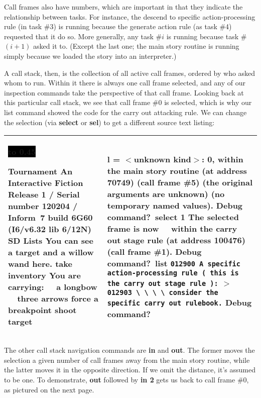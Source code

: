 \documentclass{book}
\newcommand{\n}{\hspace*{\fill}\newline}
\newcommand{\terp}[2]{\begin{center}\begin{tabular}{p{0.45\textwidth}|p{0.45\textwidth}}\midrule #1&#2\\\midrule\end{tabular}\end{center}}
\newcommand{\glkheading}[1]{\textbf{#1}}
\newcommand{\glkinput}[1]{\textbf{#1}}
\newcommand{\glkstatusline}[2]{\centerline{\colorbox{black}{\hbox to 0.45\textwidth{\textcolor{white}{#1\hfil #2}}}}}
\newcommand{\storyprompt}{\raisebox{1.5pt}{\(>\)}}
\newcommand{\cursor}{\raisebox{-1.5pt}{\RectangleThin}}
\newcommand{\markedindent}{\(>\)\qquad}
\newcommand{\unmarkedindent}{\hphantom{\(>\)}\qquad}
\begin{document}
Call frames also have numbers, which are important in that they indicate the
relationship between tasks.  For instance, the descend to specific
action-processing rule (in task \#3) is running because the generate action rule
(as task \#4) requested that it do so.  More generally, any task \#\(i\) is
running because task \#\((i+1)\) asked it to.  (Except the last one; the main
story routine is running simply because we loaded the story into an
interpreter.)

A call stack, then, is the collection of all active call frames, ordered by who
asked whom to run.  Within it there is always one call frame selected, and any
of our inspection commands take the perspective of that call frame.  Looking
back at this particular call stack, we see that call frame \#0 is selected,
which is why our list command showed the code for the carry out attacking rule.
We can change the selection (via \glkinput{select} or \glkinput{sel}) to get a
different source text listing:

\terp{\glkstatusline{Lists}{0/2}\n
  \glkheading{Tournament}\n
  An Interactive Fiction\n
  Release 1 / Serial number 120204 / Inform~7 build 6G60 (I6/v6.32 lib 6/12N) SD\n
  \n
  \glkheading{Lists}\n
  You can see a target and a willow wand here.\n
  \n
  \storyprompt\glkinput{take inventory}\n
  You are carrying:\n
  \null\ \ a longbow\n
  \null\ \ three arrows\n
  \n
  \storyprompt\glkinput{force a breakpoint}\n
  \storyprompt\glkinput{shoot target}}{%
  \qquad \qquad l = \(<\)unknown kind\(>\): 0,\n
  within the main story routine (at address 70749) (call frame \#5)\n
  \null\qquad (the original arguments are unknown)\n
  \null\qquad (no temporary named values).\n
  \n
  Debug command?\ \glkinput{select 1}\n
  \n
  The selected frame is now\n
  \null\ \ within the carry out stage rule (at address 100476) (call frame \#1).\n
  \n
  Debug command?\ \glkinput{list}\n
  \n
  \unmarkedindent \lstinline{012900 A specific action-processing rule ( this is the carry out stage rule ):}\n
  \markedindent \lstinline{012903 \ \ \ \ consider the specific carry out rulebook.}\n
  \n
  Debug command?\ \cursor}

The other call stack navigation commands are \glkinput{in} and \glkinput{out}.
The former moves the selection a given number of call frames away from the main
story routine, while the latter moves it in the opposite direction.  If we omit
the distance, it's assumed to be one.  To demonstrate, \glkinput{out} followed
by \glkinput{in 2} gets us back to call frame \#0, as pictured on the next page.
\end{document}
